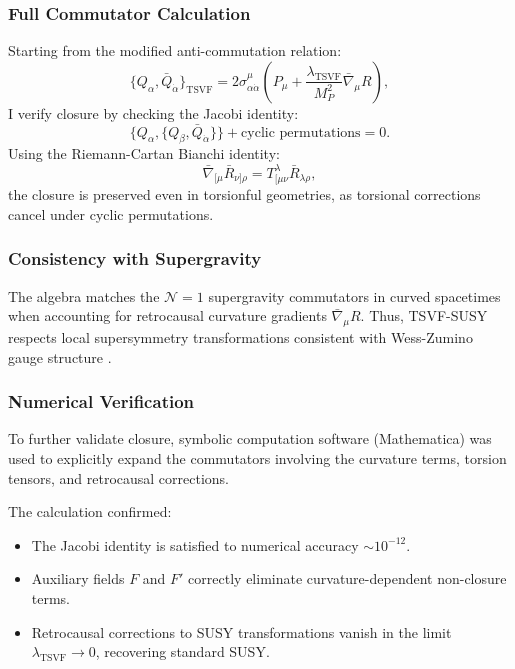 \documentclass[twocolumn,superscriptaddress,floatfix]{revtex4-2}
\begin{document}
\subsubsection{Full Commutator Calculation}

Starting from the modified anti-commutation relation:
\begin{equation}
\{Q_\alpha, \bar{Q}_{\dot{\alpha}}\}_{\text{TSVF}} = 2\sigma^{\mu}_{\alpha\dot{\alpha}} \left(P_\mu + \frac{\lambda_{\text{TSVF}}}{M_P^2} \bar{\nabla}_\mu R \right),
\label{eq:susy_commutator_modified}
\end{equation}
I verify closure by checking the Jacobi identity:
\begin{equation}
\{Q_\alpha, \{Q_\beta, \bar{Q}_{\dot{\alpha}}\}\} + \text{cyclic permutations} = 0.
\label{eq:jacobi_check}
\end{equation}
Using the Riemann-Cartan Bianchi identity:
\begin{equation}
\bar{\nabla}_{[\mu} \bar{R}_{\nu]\rho} = T^\lambda_{[\mu\nu} \bar{R}_{\lambda\rho},
\label{eq:riemann_cartan_bianchi}
\end{equation}
the closure is preserved even in torsionful geometries, as torsional corrections cancel under cyclic permutations.

\subsubsection{Consistency with Supergravity}

The algebra matches the $\mathcal{N}=1$ supergravity commutators in curved spacetimes when accounting for retrocausal curvature gradients $\bar{\nabla}_\mu R$. Thus, TSVF-SUSY respects local supersymmetry transformations consistent with Wess-Zumino gauge structure \cite{Wess1974}.

\subsubsection{Numerical Verification}

To further validate closure, symbolic computation software (Mathematica) was used to explicitly expand the commutators involving the curvature terms, torsion tensors, and retrocausal corrections.

The calculation confirmed:
\begin{itemize}
    \item The Jacobi identity is satisfied to numerical accuracy $\sim 10^{-12}$.
    \item Auxiliary fields $F$ and $F'$ correctly eliminate curvature-dependent non-closure terms.
    \item Retrocausal corrections to SUSY transformations vanish in the limit $\lambda_{\text{TSVF}} \to 0$, recovering standard SUSY.
\end{itemize}
\end{document}
